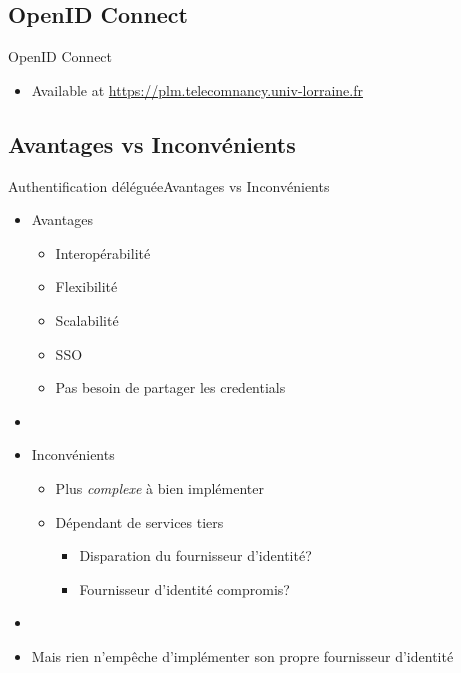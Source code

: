 \documentclass{beamer}
\begin{document}
\subsection{OpenID Connect}

\begin{frame}{OpenID Connect}
  \begin{center}
    \begin{itemize}
    \item Available at \url{https://plm.telecomnancy.univ-lorraine.fr}
    \end{itemize}
  \end{center}
\end{frame}

\subsection{Avantages vs Inconvénients}

\begin{frame}{Authentification déléguée}{Avantages vs Inconvénients}
  \begin{center}
    \begin{itemize}
      \item Avantages
      \begin{itemize}
        \item Interopérabilité
        \item Flexibilité
        \item Scalabilité
        \item SSO
        \item Pas besoin de partager les credentials
      \end{itemize}
      \pause
      \item[~]
      \item Inconvénients
      \begin{itemize}
        \item Plus \emph{complexe} à bien implémenter
        \item Dépendant de services tiers
        \begin{itemize}
          \item Disparation du fournisseur d'identité?
          \item Fournisseur d'identité compromis?
        \end{itemize}
      \end{itemize}
      \pause
      \item[~]
      \item Mais rien n'empêche d'implémenter son propre fournisseur d'identité
    \end{itemize}
  \end{center}
\end{frame}
\end{document}
